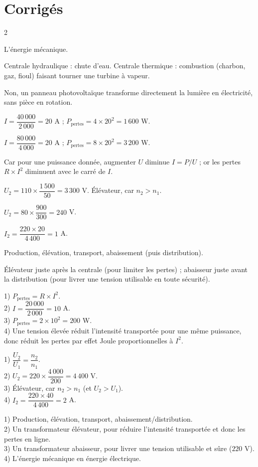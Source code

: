 \section{Corrigés}
\begin{multicols}{2}

L'énergie mécanique.

Centrale hydraulique : chute d'eau. Centrale thermique : combustion (charbon, gaz, fioul)
faisant tourner une turbine à vapeur.

Non, un panneau photovoltaïque transforme directement la lumière en électricité, sans
pièce en rotation.

$I=\dfrac{40\,000}{2\,000}=20$ A ; $P_{\text{pertes}}=4\times20^2=1\,600$ W.

$I=\dfrac{80\,000}{4\,000}=20$ A ; $P_{\text{pertes}}=8\times20^2=3\,200$ W.

Car pour une puissance donnée, augmenter $U$ diminue $I=P/U$ ; or les pertes
$R\times I^2$ diminuent avec le carré de $I$.

$U_2=110\times\dfrac{1\,500}{50}=3\,300$ V. Élévateur, car $n_2>n_1$.

$U_2=80\times\dfrac{900}{300}=240$ V.

$I_2=\dfrac{220\times20}{4\,400}=1$ A.

Production, élévation, transport, abaissement (puis distribution).

Élévateur juste après la centrale (pour limiter les pertes) ; abaisseur juste avant la
distribution (pour livrer une tension utilisable en toute sécurité).

1) $P_{\text{pertes}}=R\times I^2$.\\
2) $I=\dfrac{20\,000}{2\,000}=10$ A.\\
3) $P_{\text{pertes}}=2\times10^2=200$ W.\\
4) Une tension élevée réduit l'intensité transportée pour une même puissance, donc réduit
les pertes par effet Joule proportionnelles à $I^2$.

1) $\dfrac{U_2}{U_1}=\dfrac{n_2}{n_1}$.\\
2) $U_2=220\times\dfrac{4\,000}{200}=4\,400$ V.\\
3) Élévateur, car $n_2>n_1$ (et $U_2>U_1$).\\
4) $I_2=\dfrac{220\times40}{4\,400}=2$ A.

1) Production, élévation, transport, abaissement/distribution.\\
2) Un transformateur élévateur, pour réduire l'intensité transportée et donc les pertes
en ligne.\\
3) Un transformateur abaisseur, pour livrer une tension utilisable et sûre ($220$ V).\\
4) L'énergie mécanique en énergie électrique.

\end{multicols}
\exercicesBanner
